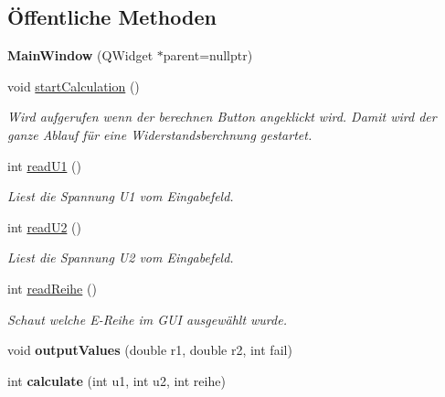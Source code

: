 \subsection*{Öffentliche Methoden}
\begin{DoxyCompactItemize}
\item 
{\bfseries Main\+Window} (Q\+Widget $\ast$parent=nullptr)\hypertarget{classMainWindow_a996c5a2b6f77944776856f08ec30858d}{}\label{classMainWindow_a996c5a2b6f77944776856f08ec30858d}

\item 
void \hyperlink{classMainWindow_a2928be63df3071466644eca76d6e32a7}{start\+Calculation} ()\hypertarget{classMainWindow_a2928be63df3071466644eca76d6e32a7}{}\label{classMainWindow_a2928be63df3071466644eca76d6e32a7}

\begin{DoxyCompactList}\small\item\em Wird aufgerufen wenn der berechnen Button angeklickt wird. Damit wird der ganze Ablauf für eine Widerstandsberchnung gestartet. \end{DoxyCompactList}\item 
int \hyperlink{classMainWindow_a3b94ad2c855f6a0df3579c48b1a6f6fd}{read\+U1} ()
\begin{DoxyCompactList}\small\item\em Liest die Spannung U1 vom Eingabefeld. \end{DoxyCompactList}\item 
int \hyperlink{classMainWindow_ab9a4bb81031d0bcb5cc5d181a26f3429}{read\+U2} ()
\begin{DoxyCompactList}\small\item\em Liest die Spannung U2 vom Eingabefeld. \end{DoxyCompactList}\item 
int \hyperlink{classMainWindow_a4869d3468f1124ae508be8e177b66ed3}{read\+Reihe} ()
\begin{DoxyCompactList}\small\item\em Schaut welche E-\/\+Reihe im G\+UI ausgewählt wurde. \end{DoxyCompactList}\item 
void {\bfseries output\+Values} (double r1, double r2, int fail)\hypertarget{classMainWindow_a12b9bbad12422386cec9da99c2ea3d57}{}\label{classMainWindow_a12b9bbad12422386cec9da99c2ea3d57}

\item 
int {\bfseries calculate} (int u1, int u2, int reihe)\hypertarget{classMainWindow_ab0f78571621e4f8e82f51464648cf017}{}\label{classMainWindow_ab0f78571621e4f8e82f51464648cf017}

\end{DoxyCompactItemize}


